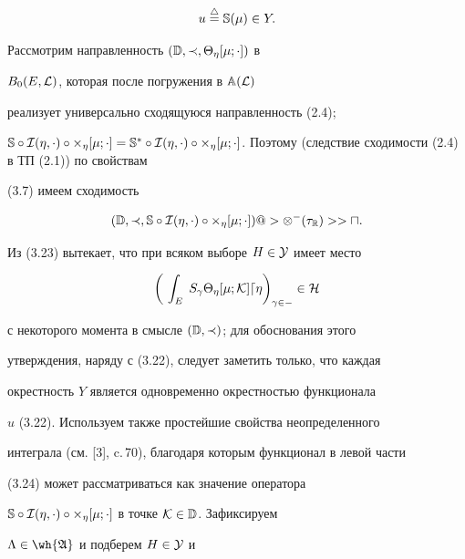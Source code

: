 \begin{pf}
\begin{equation}
u\overset{\triangle}{=}{}\Bbb S(\mu)\in Y.


\end{equation}


Рассмотрим направленность $(\Bbb D,\prec,\Theta_\eta[\mu;\cdot])$ в


$B_0(E,\cal L)$, которая после погружения в $\Bbb A(\cal L)$


реализует универсально сходящуюся направленность (2.4);


$\Bbb S\circ\cal I(\eta,\cdot)\circ\Theta_\eta[\mu;\cdot]=


\Bbb S^* \circ\cal I(\eta,\cdot)\circ\Theta_\eta[\mu;


\cdot]$. Поэтому (следствие сходимости (2.4) в ТП (2.1)) по свойствам


(3.7) имеем сходимость


\begin{equation}


(\Bbb D,\prec,\Bbb S\circ\cal I(\eta,\cdot)\circ\Theta_\eta[\mu;


\cdot])@>\otimes^\Gamma(\tau_{\Bbb R})>> u.


\end{equation}


Из (3.23) вытекает, что при всяком выборе $H\in\cal Y$ имеет место


\begin{equation}


\bigg(\,\int_E\;S_\gamma\Theta_\eta[\mu;


\cal K]d\eta\bigg)_{\gamma\in\Gamma}\in H


\end{equation}


с некоторого момента в смысле $(\Bbb D,\prec)$; для обоснования этого


утверждения, наряду с (3.22), следует заметить только, что каждая


окрестность $Y$ является одновременно окрестностью функционала


$u$ (3.22). Используем также простейшие свойства неопределенного


интеграла (см. [3], c.\,70), благодаря которым функционал в левой части


(3.24) может рассматриваться как значение оператора


$\Bbb S\circ\cal I(\eta,\cdot)\circ\Theta_\eta[\mu;


\cdot]$ в точке $\cal K\in\Bbb D$. Зафиксируем


$\Lambda\in\wh{\frak A}$ и подберем $H\in\cal Y$ и



\end{pf}
